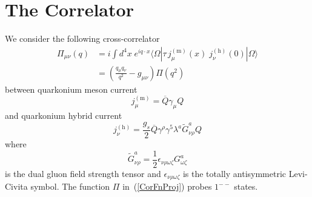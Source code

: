 \documentclass[11pt, letterpaper]{article}
\newcommand{\vev}[1]{\langle\Omega|#1|\Omega\rangle}
\begin{document}
\section{The Correlator}\label{II}
%
We consider the following cross-correlator
%
\begin{align}
  \Pi_{\mu\nu}(q) &= i\!\int d^{4}\!x \;e^{iq\cdot x} 
    \vev{\tau\, j_{\mu}^{(\text{m})}(x)\; j_{\nu}^{(\text{h})}(0)}
    \label{CorFn}\\
   &=\left(\frac{q_{\mu}q_{\nu}}{q^2}-g_{\mu\nu}\right)\Pi(q^2)
   \label{CorFnProj}
\end{align}
%
between quarkonium meson current
%
\begin{equation}\label{CurMes}
  j_{\mu}^{(\mathrm{m})} = \overline{Q}\gamma_{\mu} Q
\end{equation}
%
and quarkonium hybrid current~\cite{GovaertsReindersWeyers1985}
%
\begin{equation}\label{CurHyb}
  j_{\nu}^{(\mathrm{h})}=  \frac{g_{s}}{2}\overline{Q}\gamma^{\rho}\gamma^{5}\lambda^{a} \widetilde{G}^{a}_{\nu\rho} Q
\end{equation}
%
where
%
\begin{equation}\label{dualFieldStrength}
  \widetilde{G}^{a}_{\nu\rho} = \frac{1}{2}\epsilon_{\nu\rho\omega\zeta}G^{a}_{\omega\zeta}
\end{equation}
%
is the dual gluon field strength tensor and $\epsilon_{\nu\rho\omega\zeta}$ is the 
totally antisymmetric Levi-Civita symbol.
The function $\Pi$ in~(\ref{CorFnProj}) probes $1^{--}$ states.
\end{document}
